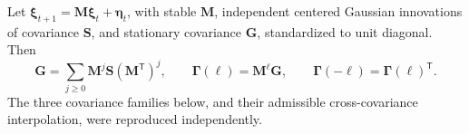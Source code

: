 \begin{lemma}\label{lem:mech-var}
Let \(\boldsymbol\xi_{t+1}=\mathbf M\boldsymbol\xi_t+\boldsymbol\eta_t\), with stable \(\mathbf M\), independent centered Gaussian innovations of covariance \(\mathbf S\), and stationary covariance \(\mathbf G\), standardized to unit diagonal. Then
\begin{equation}\label{eq:mech-var}
 \mathbf G=\sum_{j\geq0}\mathbf M^j\mathbf S(\mathbf M^{\mathsf T})^j,
 \qquad \boldsymbol\Gamma(\ell)=\mathbf M^\ell\mathbf G,
 \qquad \boldsymbol\Gamma(-\ell)=\boldsymbol\Gamma(\ell)^{\mathsf T}.
\end{equation}
The three covariance families below, and their admissible cross-covariance interpolation, were reproduced independently.
\end{lemma}
